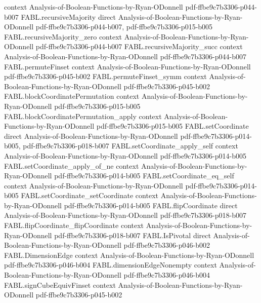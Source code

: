 \begin{theorem}
  {context}
  {Analysis-of-Boolean-Functions-by-Ryan-ODonnell}
  {pdf-ffbe9c7b3306-p044-b007}
\proofstep
  {FABL.recursiveMajority}
  {direct}
  {Analysis-of-Boolean-Functions-by-Ryan-ODonnell}
  {pdf-ffbe9c7b3306-p044-b007,
    pdf-ffbe9c7b3306-p015-b005}
\proofstep
  {FABL.recursiveMajority_zero}
  {context}
  {Analysis-of-Boolean-Functions-by-Ryan-ODonnell}
  {pdf-ffbe9c7b3306-p044-b007}
\proofstep
  {FABL.recursiveMajority_succ}
  {context}
  {Analysis-of-Boolean-Functions-by-Ryan-ODonnell}
  {pdf-ffbe9c7b3306-p044-b007}
\proofstep
  {FABL.permuteFinset}
  {context}
  {Analysis-of-Boolean-Functions-by-Ryan-ODonnell}
  {pdf-ffbe9c7b3306-p045-b002}
\proofstep
  {FABL.permuteFinset_symm}
  {context}
  {Analysis-of-Boolean-Functions-by-Ryan-ODonnell}
  {pdf-ffbe9c7b3306-p045-b002}
\proofstep
  {FABL.blockCoordinatePermutation}
  {context}
  {Analysis-of-Boolean-Functions-by-Ryan-ODonnell}
  {pdf-ffbe9c7b3306-p015-b005}
\proofstep
  {FABL.blockCoordinatePermutation_apply}
  {context}
  {Analysis-of-Boolean-Functions-by-Ryan-ODonnell}
  {pdf-ffbe9c7b3306-p015-b005}
\proofstep
  {FABL.setCoordinate}
  {direct}
  {Analysis-of-Boolean-Functions-by-Ryan-ODonnell}
  {pdf-ffbe9c7b3306-p014-b005,
    pdf-ffbe9c7b3306-p018-b007}
\proofstep
  {FABL.setCoordinate_apply_self}
  {context}
  {Analysis-of-Boolean-Functions-by-Ryan-ODonnell}
  {pdf-ffbe9c7b3306-p014-b005}
\proofstep
  {FABL.setCoordinate_apply_of_ne}
  {context}
  {Analysis-of-Boolean-Functions-by-Ryan-ODonnell}
  {pdf-ffbe9c7b3306-p014-b005}
\proofstep
  {FABL.setCoordinate_eq_self}
  {context}
  {Analysis-of-Boolean-Functions-by-Ryan-ODonnell}
  {pdf-ffbe9c7b3306-p014-b005}
\proofstep
  {FABL.setCoordinate_setCoordinate}
  {context}
  {Analysis-of-Boolean-Functions-by-Ryan-ODonnell}
  {pdf-ffbe9c7b3306-p014-b005}
\proofstep
  {FABL.flipCoordinate}
  {direct}
  {Analysis-of-Boolean-Functions-by-Ryan-ODonnell}
  {pdf-ffbe9c7b3306-p018-b007}
\proofstep
  {FABL.flipCoordinate_flipCoordinate}
  {context}
  {Analysis-of-Boolean-Functions-by-Ryan-ODonnell}
  {pdf-ffbe9c7b3306-p018-b007}
\proofstep
  {FABL.IsPivotal}
  {direct}
  {Analysis-of-Boolean-Functions-by-Ryan-ODonnell}
  {pdf-ffbe9c7b3306-p046-b002}
\proofstep
  {FABL.DimensionEdge}
  {context}
  {Analysis-of-Boolean-Functions-by-Ryan-ODonnell}
  {pdf-ffbe9c7b3306-p046-b004}
\proofstep
  {FABL.dimensionEdgeNonempty}
  {context}
  {Analysis-of-Boolean-Functions-by-Ryan-ODonnell}
  {pdf-ffbe9c7b3306-p046-b004}
\proofstep
  {FABL.signCubeEquivFinset}
  {context}
  {Analysis-of-Boolean-Functions-by-Ryan-ODonnell}
  {pdf-ffbe9c7b3306-p045-b002}
\proofstep

\end{theorem}
